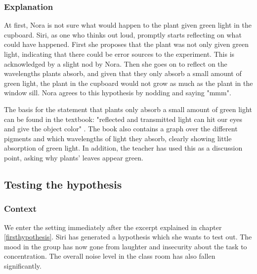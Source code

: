 \subsubsection*{Explanation}
At first, Nora is not sure what would happen to the plant given green light in the cupboard. Siri, as one who thinks out loud, promptly starts reflecting on what could have happened. First she proposes that the plant was not only given green light, indicating that there could be error sources to the experiment. This is acknowledged by a slight nod by Nora. Then she goes on to reflect on the wavelengths plants absorb, and given that they only absorb a small amount of green light, the plant in the cupboard would not grow as much as the plant in the window sill. Nora agrees to this hypothesis by nodding and saying "mmm". 

The basis for the statement that plants only absorb a small amount of green light can be found in the textbook: "reflected and transmitted light can hit our eyes and give the object color" \citep[pg. 103]{bios}. The book also contains a graph over the different pigments and which wavelengths of light they absorb, clearly showing little absorption of green light. In addition, the teacher has used this as a discussion point, asking why plants' leaves appear green. 

\subsection{Testing the hypothesis}

\subsubsection*{Context}
We enter the setting immediately after the excerpt explained in chapter \ref{firsthypothesis}. Siri has generated a hypothesis which she wants to test out. The mood in the group has now gone from laughter and insecurity about the task to concentration. The overall noise level in the class room has also fallen significantly. 

